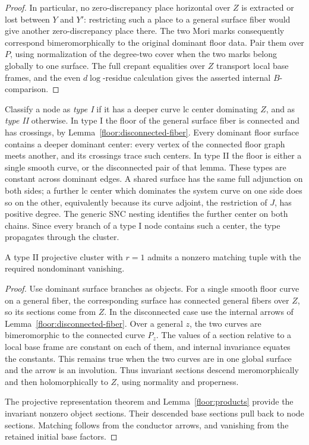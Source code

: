 \begin{proof}
In particular, no zero-discrepancy place
horizontal over $Z$ is extracted or lost
between $Y$ and $Y'$: restricting such a
place to a general surface fiber would
give another zero-discrepancy place there.
The two Mori marks consequently correspond
bimeromorphically to the original dominant
floor data.  Pair them over $P$, using
normalization of the degree-two cover when
the two marks belong globally to one
surface.  The full crepant equalities over
$Z$ transport local base frames, and the
even $d\log$-residue calculation gives
the asserted internal $B$-comparison.
\end{proof}

Classify a node as \emph{type I} if it has a
deeper curve lc center dominating $Z$, and as
\emph{type II} otherwise.  In type I the floor
of the general surface fiber is connected and
has crossings, by
Lemma~\ref{floor:disconnected-fiber}.  Every
dominant floor surface contains a deeper
dominant center: every vertex of the connected
floor graph meets another, and its crossings
trace such centers.  In type II the floor is
either a single smooth curve, or the
disconnected pair of that lemma.  These types
are constant across dominant edges.  A shared
surface has the same full adjunction on both
sides; a further lc center which dominates
the system curve on one side does so on the
other, equivalently because its curve
adjoint, the restriction of $J$, has positive
degree.  The generic SNC nesting identifies
the further center on both chains.  Since
every branch of a type I node contains such
a center, the type propagates through the
cluster.

\begin{lemma}
\label{floor:projective-r1-II}
A type II projective cluster with $r=1$
admits a nonzero matching tuple with the
required nondominant vanishing.
\end{lemma}

\begin{proof}
Use dominant surface branches as objects.
For a single smooth floor curve on a
general fiber, the corresponding surface
has connected general fibers over $Z$,
so its sections come from $Z$.  In the
disconnected case use the internal arrows
of Lemma~\ref{floor:disconnected-fiber}.
Over a general $z$, the two curves are
bimeromorphic to the connected curve
$P_z$.  The values of a section relative
to a local base frame are constant on
each of them, and internal invariance
equates the constants.  This remains true
when the two curves are in one global
surface and the arrow is an involution.
Thus invariant sections descend
meromorphically and then holomorphically
to $Z$, using normality and properness.

The projective representation theorem
and Lemma~\ref{floor:products} provide
the invariant nonzero object sections.
Their descended base sections pull back
to node sections.  Matching follows
from the conductor arrows, and vanishing
from the retained initial base factors.
\end{proof}

